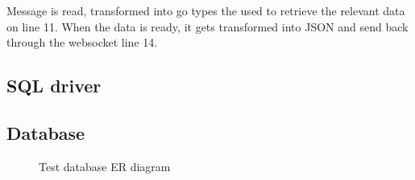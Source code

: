 Message is read, transformed into go types the used to retrieve the relevant data on line 11. When the data is ready, it gets transformed into JSON and send back through the websocket line 14.

\subsection{SQL driver}
\subsection{Database}\label{sec:database}

\begin{sidewaysfigure}
  \centering
  \caption{Test database ER diagram}
  \label{fig:databaseer}
\end{sidewaysfigure}
